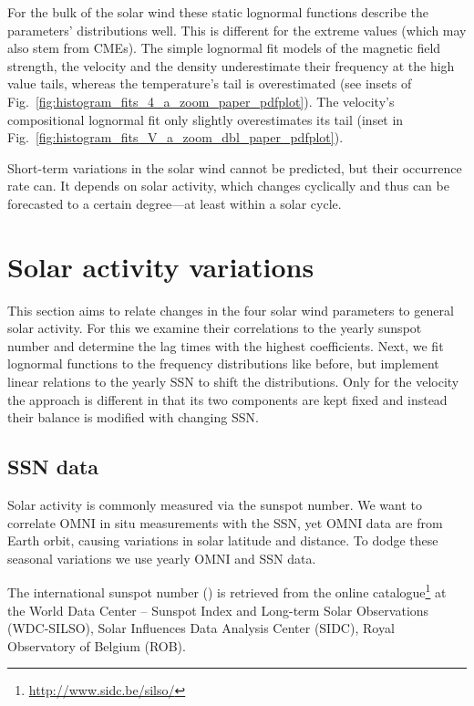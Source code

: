For the bulk of the solar wind these static lognormal functions describe the parameters' distributions well. This is different for the extreme values (which may also stem from CMEs). The simple lognormal fit models of the magnetic field strength, the velocity and the density underestimate their frequency at the high value tails, whereas the temperature's tail is overestimated (see insets of Fig.~\ref{fig:histogram_fits_4_a_zoom_paper_pdfplot}). The velocity's compositional lognormal fit only slightly overestimates its tail (inset in Fig.~\ref{fig:histogram_fits_V_a_zoom_dbl_paper_pdfplot}).

Short-term variations in the solar wind cannot be predicted, but their occurrence rate can. It depends on solar activity, which changes cyclically and thus can be forecasted to a certain degree---at least within a solar cycle.


\section{Solar activity variations}
\label{sec:solar_activity_variations}
This section aims to relate changes in the four solar wind parameters to general solar activity. For this we examine their correlations to the yearly sunspot number and determine the lag times with the highest coefficients. Next, we fit lognormal functions to the frequency distributions like before, but implement linear relations to the yearly SSN to shift the distributions. Only for the velocity the approach is different in that its two components are kept fixed and instead their balance is modified with changing SSN.

\subsection{SSN data}
Solar activity is commonly measured via the sunspot number. We want to correlate OMNI in situ measurements with the SSN, yet OMNI data are from Earth orbit, causing variations in solar latitude and distance. To dodge these seasonal variations we use yearly OMNI and SSN data.

The international sunspot number (\citeyear{sidc}) is retrieved from the online catalogue\footnote{\url{http://www.sidc.be/silso/}} at the World Data Center -- Sunspot Index and Long-term Solar Observations (WDC-SILSO), Solar Influences Data Analysis Center (SIDC), Royal Observatory of Belgium (ROB).\\

